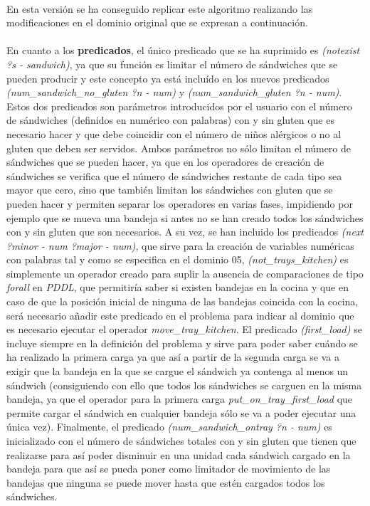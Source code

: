 \documentclass{article}
\begin{document}
\paragraph{}
En esta versión se ha conseguido replicar este algoritmo realizando las modificaciones en el dominio original que se expresan a continuación.

\paragraph{}
En cuanto a los \textbf{predicados}, el único predicado que se ha suprimido es \textit{(notexist ?s - sandwich)}, ya que su función es limitar el número de sándwiches que se pueden producir y este concepto ya está incluído en los nuevos predicados \textit{(num\_sandwich\_no\_gluten ?n - num)} y \textit{(num\_sandwich\_gluten ?n - num)}. Estos dos predicados son parámetros introducidos por el usuario con el número de sándwiches (definidos en numérico con palabras) con y sin gluten que es necesario hacer y que debe coincidir con el número de niños alérgicos o no al gluten que deben ser servidos. Ambos parámetros no sólo limitan el número de sándwiches que se pueden hacer, ya que en los operadores de creación de sándwiches se verifica que el número de sándwiches restante de cada tipo sea mayor que cero, sino que también limitan los sándwiches con gluten que se pueden hacer y permiten separar los operadores en varias fases, impidiendo por ejemplo que se mueva una bandeja si antes no se han creado todos los sándwiches con y sin gluten que son necesarios. A su vez, se han incluido los predicados \textit{(next ?minor - num ?major - num)}, que sirve para la creación de variables numéricas con palabras tal y como se especifica en el dominio 05, \textit{(not\_trays\_kitchen)} es simplemente un operador creado para suplir la ausencia de comparaciones de tipo \textit{forall} en \textit{PDDL}, que permitiría saber si existen bandejas en la cocina y que en caso de que la posición inicial de ninguna de las bandejas coincida con la cocina, será necesario añadir este predicado en el problema para indicar al dominio que es necesario ejecutar el operador \textit{move\_tray\_kitchen}. El predicado \textit{(first\_load)} se incluye siempre en la definición del problema y sirve para poder saber cuándo se ha realizado la primera carga ya que así a partir de la segunda carga se va a exigir que la bandeja en la que se cargue el sándwich ya contenga al menos un sándwich (consiguiendo con ello que todos los sándwiches se carguen en la misma bandeja, ya que el operador para la primera carga \textit{put\_on\_tray\_first\_load} que permite cargar el sándwich en cualquier bandeja sólo se va a poder ejecutar una única vez). Finalmente, el predicado \textit{(num\_sandwich\_ontray ?n - num)} es inicializado con el número de sándwiches totales con y sin gluten que tienen que realizarse para así poder disminuir en una unidad cada sándwich cargado en la bandeja para que así se pueda poner como limitador de movimiento de las bandejas que ninguna se puede mover hasta que estén cargados todos los sándwiches.
\end{document}
